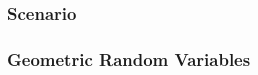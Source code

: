 \documentclass[handout]{beamer}
\newcommand{\blue}[1]{\textcolor{blue2}{#1}}
\begin{document}
\begin{frame}[fragile]
\frametitle{Scenario}

%
%
%
%
%

\end{frame}


\begin{frame}[fragile]
\frametitle{Geometric Random Variables}

%
%
%


\end{frame}
\end{document}
